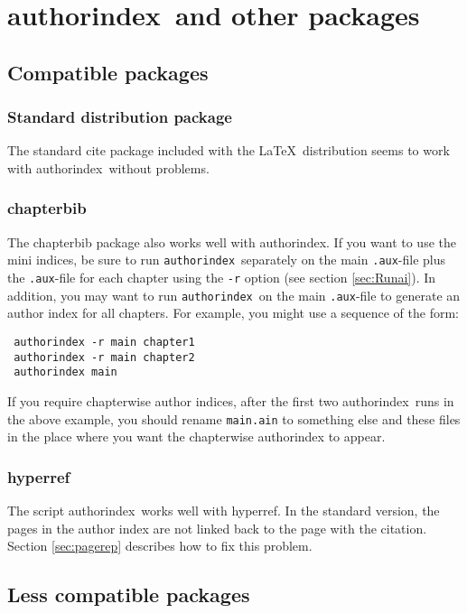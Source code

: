 \documentclass[a4paper]{article}
\newcommand{\package}[1]{\textsf{#1}}
\newcommand{\authorindex}{\package{authorindex}}
\newcommand{\file}[1]{\texttt{#1}}
\newcommand{\fnext}[1]{\file{.#1}}
\newcommand{\cmdline}[1]{\texttt{#1}}
\newcommand{\option}[1]{\cmdline{#1}}
\newcommand{\aiperl}{\cmdline{authorindex}}
\newcommand{\ltxinp}[1]{\texttt{\string#1}}
\begin{document}
\section{\authorindex\ and other packages}

\subsection{Compatible packages}

\subsubsection{Standard distribution package}

The standard \package{cite} package included with the \LaTeX\ distribution
seems to work with \authorindex\ without problems.

\subsubsection{chapterbib}

The \package{chapterbib} package also works well with \authorindex.  If you
want to use the mini indices, be sure to run \aiperl\ separately on the main
\fnext{aux}-file plus the \fnext{aux}-file for each chapter using the
\option{-r} option (see section \ref{sec:Runai}). In addition, you may want to
run \aiperl\ on the main \fnext{aux}-file to generate an author index for all
chapters. For example, you might use a sequence of the form:
\begin{verbatim}
 authorindex -r main chapter1
 authorindex -r main chapter2
 authorindex main
\end{verbatim}
If you require chapterwise author indices, after the first two \authorindex\ 
runs in the above example, you should rename \file{main.ain} to something else
and \ltxinp{} these files in the place where you want the chapterwise
authorindex to appear.

\subsubsection{hyperref}

The script \authorindex\ works well with \package{hyperref}.  In the standard
version, the pages in the author index are not linked back to the page with the
citation.  Section \ref{sec:pagerep} describes how to fix this problem.

\subsection{Less compatible packages}
\end{document}
